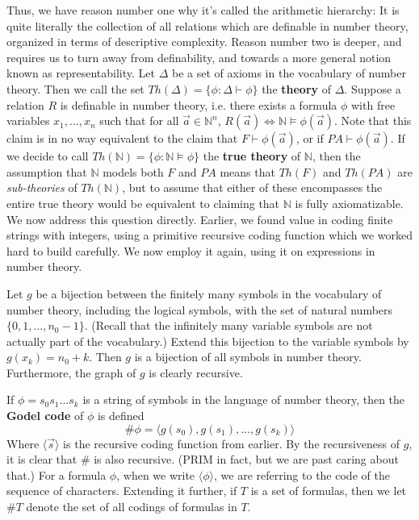Thus, we have reason number one why it's called the arithmetic hierarchy: It is quite literally the collection of all relations which are definable in number theory, organized in terms of descriptive complexity. Reason number two is deeper, and requires us to turn away from definability, and towards a more general notion known as representability. Let $\Delta$ be a set of axioms in the vocabulary of number theory. Then we call the set $Th(\Delta) = \{\phi: \Delta \vdash \phi \}$ the \textbf{theory} of $\Delta$. Suppose a relation $R$ is definable in number theory, i.e. there exists a formula $\phi$ with free variables $x_1,...,x_n$ such that for all $\vec{a} \in \mathbb{N}^n$, $R(\vec{a}) \iff \mathbb{N} \models \phi(\vec{a})$. Note that this claim is in no way equivalent to the claim that $F \vdash \phi(\vec{a})$, or if $PA \vdash \phi(\vec{a})$. If we decide to call $Th(\mathbb{N}) = \{\phi: \mathbb{N} \models \phi\}$ the \textbf{true theory} of $\mathbb{N}$, then the assumption that $\mathbb{N}$ models both $F$ and $PA$ means that $Th(F)$ and $Th(PA)$ are \textit{sub-theories} of $Th(\mathbb{N})$, but to assume that either of these encompasses the entire true theory would be equivalent to claiming that $\mathbb{N}$ is fully axiomatizable. We now address this question directly.
Earlier, we found value in coding finite strings with integers, using a primitive recursive coding function which we worked hard to build carefully. We now employ it again, using it on expressions in number theory.
\par Let $g$ be a bijection between the finitely many symbols in the vocabulary of number theory, including the logical symbols, with the set of natural numbers $\{0,1,...,n_0-1\}$. (Recall that the infinitely many variable symbols are not actually part of the vocabulary.) Extend this bijection to the variable symbols by $g(x_k) = n_0+k$. Then $g$ is a bijection of all symbols in number theory. Furthermore, the graph of $g$ is clearly recursive. 
\begin{definition}
    If $\phi = s_0s_1...s_k$ is a string of symbols in the language of number theory, then the \textbf{Godel code} of $\phi$ is defined 
    \[\#\phi = \langle g(s_0),g(s_1),...,g(s_k) \rangle \]
    Where $\langle \vec{s} \rangle$ is the recursive coding function from earlier. By the recursiveness of $g$, it is clear that $\#$ is also recursive. (PRIM in fact, but we are past caring about that.) For a formula $\phi$, when we write $\langle \phi \rangle$, we are referring to the code of the sequence of characters. Extending it further, if $T$ is a set of formulas, then we let $\#T$ denote the set of all codings of formulas in $T$.
\end{definition}
